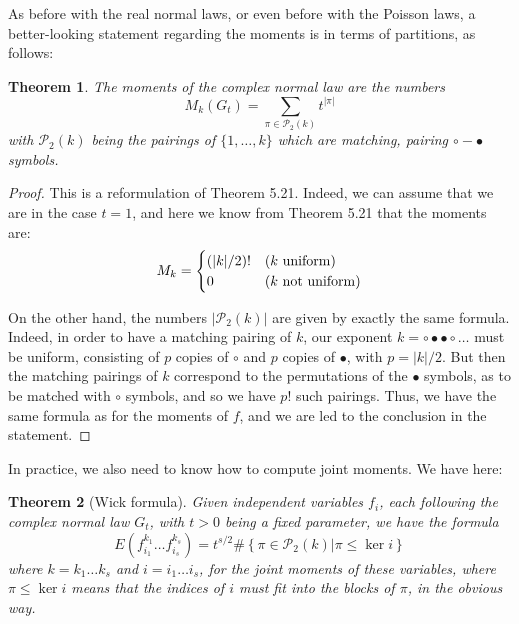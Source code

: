 \documentclass[12pt]{amsbook}
\newtheorem{theorem}{Theorem}[chapter]
\begin{document}
As before with the real normal laws, or even before with the Poisson laws, a better-looking statement regarding the moments is in terms of partitions, as follows:


\begin{theorem}
The moments of the complex normal law are the numbers
$$M_k(G_t)=\sum_{\pi\in\mathcal P_2(k)}t^{|\pi|}$$
with $\mathcal P_2(k)$ being the pairings of $\{1,\ldots,k\}$ which are matching, pairing $\circ-\bullet$ symbols.
\end{theorem}

\begin{proof}
This is a reformulation of Theorem 5.21. Indeed, we can assume that we are in the case $t=1$, and here we know from Theorem 5.21 that the moments are:
$$M_k=\begin{cases}
(|k|/2)!&(k\ {\rm uniform})\\
0&(k\ {\rm not\ uniform})
\end{cases}$$

On the other hand, the numbers $|\mathcal P_2(k)|$ are given by exactly the same formula. Indeed, in order to have a matching pairing of $k$, our exponent $k=\circ\bullet\bullet\circ\ldots$ must be uniform, consisting of $p$ copies of $\circ$ and $p$ copies of $\bullet$, with $p=|k|/2$. But then the matching pairings of $k$ correspond to the permutations of the $\bullet$ symbols, as to be matched with $\circ$ symbols, and so we have $p!$ such pairings. Thus, we have the same formula as for the moments of $f$, and we are led to the conclusion in the statement.
\end{proof}

In practice, we also need to know how to compute joint moments. We have here:


\begin{theorem}[Wick formula]
Given independent variables $f_i$, each following the complex normal law $G_t$, with $t>0$ being a fixed parameter, we have the formula
$$E\left(f_{i_1}^{k_1}\ldots f_{i_s}^{k_s}\right)=t^{s/2}\#\left\{\pi\in\mathcal P_2(k)\Big|\pi\leq\ker i\right\}$$
where $k=k_1\ldots k_s$ and $i=i_1\ldots i_s$, for the joint moments of these variables, where $\pi\leq\ker i$ means that the indices of $i$ must fit into the blocks of $\pi$, in the obvious way.
\end{theorem}
\end{document}
